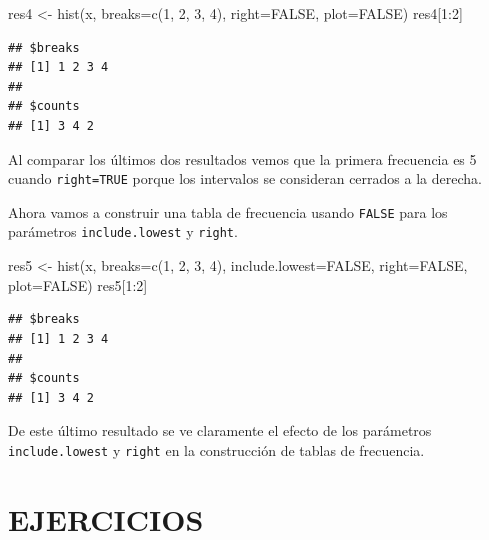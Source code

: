 \documentclass[
]{book}
\makeatletter
\newenvironment{Shaded}{\begin{snugshade}}{\end{snugshade}}
\newcommand{\AttributeTok}[1]{\textcolor[rgb]{0.77,0.63,0.00}{#1}}
\newcommand{\ConstantTok}[1]{\textcolor[rgb]{0.00,0.00,0.00}{#1}}
\newcommand{\DecValTok}[1]{\textcolor[rgb]{0.00,0.00,0.81}{#1}}
\newcommand{\FunctionTok}[1]{\textcolor[rgb]{0.00,0.00,0.00}{#1}}
\newcommand{\NormalTok}[1]{#1}
\newcommand{\OtherTok}[1]{\textcolor[rgb]{0.56,0.35,0.01}{#1}}
\newcommand{\SpecialCharTok}[1]{\textcolor[rgb]{0.00,0.00,0.00}{#1}}
\newenvironment{kframe}{%
\medskip{}
\setlength{\fboxsep}{.8em}
 \def\at@end@of@kframe{}%
 \ifinner\ifhmode%
  \def\at@end@of@kframe{\end{minipage}}%
  \begin{minipage}{\columnwidth}%
 \fi\fi%
 \def\FrameCommand##1{\hskip\@totalleftmargin \hskip-\fboxsep
 \colorbox{shadecolor}{##1}\hskip-\fboxsep
     \hskip-\linewidth \hskip-\@totalleftmargin \hskip\columnwidth}%
 \MakeFramed {\advance\hsize-\width
   \@totalleftmargin\z@ \linewidth\hsize
   \@setminipage}}%
 {\par\unskip\endMakeFramed%
 \at@end@of@kframe}
\renewenvironment{Shaded}{\begin{kframe}}{\end{kframe}}
\makeatother
\begin{document}
\begin{Shaded}
\begin{Highlighting}[]
\NormalTok{res4 }\OtherTok{\textless{}{-}} \FunctionTok{hist}\NormalTok{(x, }\AttributeTok{breaks=}\FunctionTok{c}\NormalTok{(}\DecValTok{1}\NormalTok{, }\DecValTok{2}\NormalTok{, }\DecValTok{3}\NormalTok{, }\DecValTok{4}\NormalTok{), }\AttributeTok{right=}\ConstantTok{FALSE}\NormalTok{, }\AttributeTok{plot=}\ConstantTok{FALSE}\NormalTok{)}
\NormalTok{res4[}\DecValTok{1}\SpecialCharTok{:}\DecValTok{2}\NormalTok{]}
\end{Highlighting}
\end{Shaded}

\begin{verbatim}
## $breaks
## [1] 1 2 3 4
## 
## $counts
## [1] 3 4 2
\end{verbatim}

Al comparar los últimos dos resultados vemos que la primera frecuencia es 5 cuando \texttt{right=TRUE} porque los intervalos se consideran cerrados a la derecha.

Ahora vamos a construir una tabla de frecuencia usando \texttt{FALSE} para los parámetros \texttt{include.lowest} y \texttt{right}.

\begin{Shaded}
\begin{Highlighting}[]
\NormalTok{res5 }\OtherTok{\textless{}{-}} \FunctionTok{hist}\NormalTok{(x, }\AttributeTok{breaks=}\FunctionTok{c}\NormalTok{(}\DecValTok{1}\NormalTok{, }\DecValTok{2}\NormalTok{, }\DecValTok{3}\NormalTok{, }\DecValTok{4}\NormalTok{),}
             \AttributeTok{include.lowest=}\ConstantTok{FALSE}\NormalTok{, }\AttributeTok{right=}\ConstantTok{FALSE}\NormalTok{,}
             \AttributeTok{plot=}\ConstantTok{FALSE}\NormalTok{)}
\NormalTok{res5[}\DecValTok{1}\SpecialCharTok{:}\DecValTok{2}\NormalTok{]}
\end{Highlighting}
\end{Shaded}

\begin{verbatim}
## $breaks
## [1] 1 2 3 4
## 
## $counts
## [1] 3 4 2
\end{verbatim}

De este último resultado se ve claramente el efecto de los parámetros \texttt{include.lowest} y \texttt{right} en la construcción de tablas de frecuencia.

\hypertarget{ejercicios-4}{%
\section*{EJERCICIOS}\label{ejercicios-4}}
\end{document}
